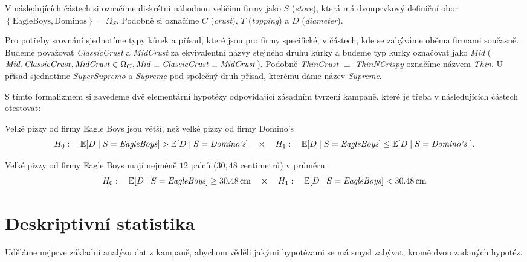 \documentclass[czech]{article}
\newcommand\E{\ensuremath{\mathbb{E}}}
\newcommand\against{\ensuremath{\quad\times\quad}}
\begin{document}
V následujících částech si označíme diskrétní náhodnou veličinu firmy jako $S$ (\emph{store}), která má dvouprvkový definiční obor $\left\{ \text{EagleBoys}, \text{Dominos} \right\} = \Omega_{S} $. Podobně si označíme $C$ (\emph{crust}),  $T$ (\emph{topping}) a $D$ (\emph{diameter}).

Pro potřeby srovnání sjednotíme typy kůrek a přísad, které jsou pro firmy specifické, v částech, kde se zabýváme oběma firmami současně. Budeme považovat \emph{ClassicCrust} a \emph{MidCrust} za ekvivalentní názvy stejného druhu kůrky a budeme typ kůrky označovat jako \emph{Mid} ($\text{\emph{Mid}} ,\text{\emph{ClassicCrust}} ,\text{\emph{MidCrust}} \in \Omega_{C}, \text{\emph{Mid}} \equiv \text{\emph{ClassicCrust}} \equiv \text{\emph{MidCrust}}$). Podobně \emph{ThinCrust} $\equiv$ \emph{ThinNCrispy} označíme názvem \emph{Thin}. U přísad sjednotíme \emph{SuperSupremo} a \emph{Supreme} pod společný druh přísad, kterému dáme název \emph{Supreme}.

S tímto formalizmem si zavedeme dvě elementární hypotézy odpovídající zásadním tvrzení kampaně, které je třeba v následujících částech otestovat:
\begin{hypothesis}
	\label{hyp:nerovnost_mezi_velikostmi_pizz_firem}
	Velké pizzy od firmy Eagle Boys jsou větší, než velké pizzy od firmy Domino's
	\[
		H_0: \quad \E [D \mid S = \text{\emph{EagleBoys}}] > \E [D \mid S = \text{\emph{Domino's}}]
		\against H_1: \quad \E [ D \mid S = \text{\emph{EagleBoys}} ] \le \E [D \mid S =
			\text{\emph{Domino's} }].
	\]

\end{hypothesis}
\begin{hypothesis}
	\label{hyp:velikost_12_palcu}
	Velké pizzy od firmy Eagle Boys mají nejméně $12$ palců ($30{,}48$ centimetrů) v průměru
	\[
		H_0: \quad \E [D \mid S = \text{\emph{EagleBoys}}] \ge \SI{30.48}{\cm} \against H_1: \quad
		\E [D \mid S = \text{\emph{EagleBoys}}] < \SI{30.48}{\cm}
	\]
\end{hypothesis}


\section{Deskriptivní statistika}%
\label{sec:deskriptivní_statistika}

Uděláme nejprve základní analýzu dat z kampaně, abychom věděli jakými hypotézami se má smysl zabývat, kromě dvou zadaných hypotéz.
\pagebreak
\end{document}
